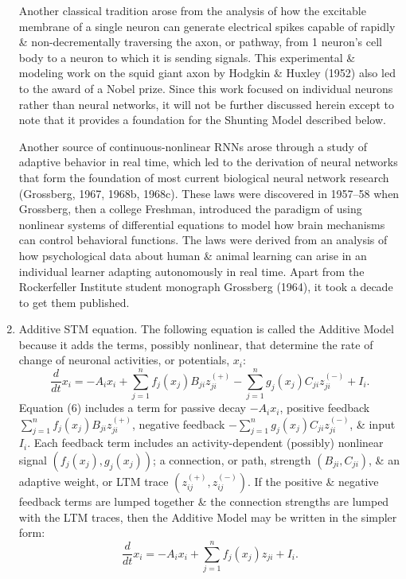\documentclass{article}
\begin{document}
\begin{enumerate}
	Another classical tradition arose from the analysis of how the excitable membrane of a single neuron can generate electrical spikes capable of rapidly \& non-decrementally traversing the axon, or pathway, from 1 neuron's cell body to a neuron to which it is sending signals. This experimental \& modeling work on the squid giant axon by Hodgkin \& Huxley (1952) also led to the award of a Nobel prize. Since this work focused on individual neurons rather than neural networks, it will not be further discussed herein except to note that it provides a foundation for the Shunting Model described below.
	
	Another source of continuous-nonlinear RNNs arose through a study of adaptive behavior in real time, which led to the derivation of neural networks that form the foundation of most current biological neural network research  (Grossberg, 1967, 1968b, 1968c). These laws were discovered in 1957--58 when Grossberg, then a college Freshman, introduced the paradigm of using nonlinear systems of differential equations to model how brain mechanisms can control behavioral functions. The laws were derived from an analysis of how psychological data about human \& animal learning can arise in an individual learner adapting autonomously in real time. Apart from the Rockerfeller Institute student monograph Grossberg (1964), it took a decade to get them published.
	\item {\sf Additive STM equation.} The following equation is called the Additive Model because it adds the terms, possibly nonlinear, that determine the rate of change of neuronal activities, or potentials, $x_i$:
	\begin{equation}
		\frac{d}{dt}x_i = -A_ix_i + \sum_{j=1}^n f_j(x_j)B_{ji}z_{ji}^{(+)} - \sum_{j=1}^n g_j(x_j)C_{ji}z_{ji}^{(-)} + I_i.
	\end{equation}
	Equation (6) includes a term for passive decay $-A_ix_i$, positive feedback $\sum_{j=1}^n f_j(x_j)B_{ji}z_{ji}^{(+)}$, negative feedback $- \sum_{j=1}^n g_j(x_j)C_{ji}z_{ji}^{(-)}$, \& input $I_i$. Each feedback term includes an activity-dependent (possibly) nonlinear signal $(f_j(x_j),g_j(x_j))$; a connection, or path, strength $(B_{ji},C_{ji})$, \& an adaptive weight, or LTM trace $(z_{ij}^{(+)},z_{ij}^{(-)})$. If the positive \& negative feedback terms are lumped together \& the connection strengths are lumped with the LTM traces, then the Additive Model may be written in the simpler form:
	\begin{equation}
		\frac{d}{dt}x_i = -A_ix_i + \sum_{j=1}^n f_j(x_j)z_{ji} + I_i.

\end{equation}
\end{enumerate}
\end{document}

